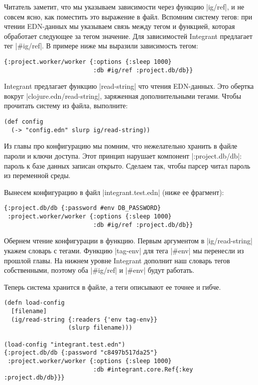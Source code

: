 Читатель заметит, что мы указываем зависимости через функцию \spverb|ig/ref|, и не
совсем ясно, как поместить это выражение в файл. Вспомним систему тегов: при
чтении EDN-данных мы указываем связь между тегом и функцией, которая обработает
следующее за тегом значение. Для зависимостей Integrant предлагает тег
\spverb|#ig/ref|. В примере ниже мы выразили зависимость тегом:

\begin{verbatim}
{:project.worker/worker {:options {:sleep 1000}
                         :db #ig/ref :project.db/db}}
\end{verbatim}

Integrant предлагает функцию \spverb|read-string| что чтения EDN-данных. Это обертка
вокруг \spverb|clojure.edn/read-string|, заряженная дополнительными тегами. Чтобы
прочитать систему из файла, выполните:

\begin{verbatim}
(def config
  (-> "config.edn" slurp ig/read-string))
\end{verbatim}

Из главы про конфигурацию мы помним, что нежелательно хранить в файле пароли и
ключи доступа. Этот принцип нарушает компонент \spverb|:project.db/db|: пароль к базе
данных записан открыто. Сделаем так, чтобы парсер читал пароль из переменной
среды.

Вынесем конфигурацию в файл \spverb|integrant.test.edn| (ниже ее фрагмент):

\begin{verbatim}
{:project.db/db {:password #env DB_PASSWORD}
 :project.worker/worker {:options {:sleep 1000}
                         :db #ig/ref :project.db/db}}
\end{verbatim}

Обернем чтение конфигурации в функцию. Первым аргументом в \spverb|ig/read-string|
укажем словарь с тегами. Функцию \spverb|tag-env| для тега \spverb|#env| мы перенесли из
прошлой главы. На нижнем уровне Integrant дополнит наш словарь тегов
собственными, поэтому оба \spverb|#ig/ref| и \spverb|#env| будут работать.

Теперь система хранится в файле, а теги описывают ее точнее и гибче.

\begin{verbatim}
(defn load-config
  [filename]
  (ig/read-string {:readers {'env tag-env}}
                  (slurp filename)))

(load-config "integrant.test.edn")
{:project.db/db {:password "c8497b517da25"}
 :project.worker/worker {:options {:sleep 1000}
                         :db #integrant.core.Ref{:key :project.db/db}}}
\end{verbatim}

